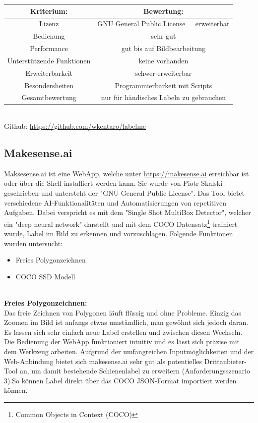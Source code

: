 \documentclass[11pt]{scrartcl}
\begin{document}
\noindent 
\begin{tabular}[h]{c|c}
Kriterium: & Bewertung:\\
\hline
Lizenz & GNU General Public License = erweiterbar\\
Bedienung & sehr gut \\
Performance & gut bis auf Bildbearbeitung\\
Unterstützende Funktionen & keine vorhanden\\
Erweiterbarkeit & schwer erweiterbar\\
Besondersheiten & Programmierbarkeit mit Scripts\\
\hline
Gesamtbewertung & nur für händisches Labeln zu gebrauchen\\
\end{tabular}
\\

\noindent
Github: \url{https://github.com/wkentaro/labelme} 

\subsection{Makesense.ai}
\label{sec:Makesense.ai}

Maksesense.ai ist eine WebApp, welche unter \url{https://makesense.ai}  erreichbar ist oder über die Shell installiert werden kann. Sie wurde von Piotr Skalski geschrieben und untersteht der "GNU General Public License". Das Tool bietet verschiedene AI-Funktionalitäten und Automatisierungen von repetitiven Aufgaben. Dabei verspricht es mit dem "Single Shot MultiBox Detector", welcher ein "deep neural network" darstellt und mit dem COCO Datensatz\footnote{Common Objects in Context (COCO)} trainiert wurde, Label im Bild zu erkennen und vorzuschlagen. Folgende Funktionen wurden untersucht:
\begin{itemize}
	\item Freies Polygonzeichnen
	\item COCO SSD Modell 
\end{itemize}
\noindent
\\
\textbf{Freies Polygonzeichnen:}
\\

\noindent
Das freie Zeichnen von Polygonen läuft flüssig und ohne Probleme. Einzig das Zoomen im Bild ist anfangs etwas umständlich, man gewöhnt sich jedoch daran. Es lassen sich sehr einfach neue Label erstellen und zwischen diesen Wechseln. Die Bedienung der WebApp funktioniert intuitiv und es lässt sich präzise mit dem Werkzeug arbeiten. Aufgrund der umfangreichen Inputmöglichkeiten und der Web-Anbindung bietet sich makesense.ai sehr gut als potentielles Drittanbieter-Tool an, um damit bestehende Schienenlabel zu erweitern (Anforderungsszenario 3).So können Label direkt über das COCO JSON-Format importiert werden können.
\\
\end{document}
